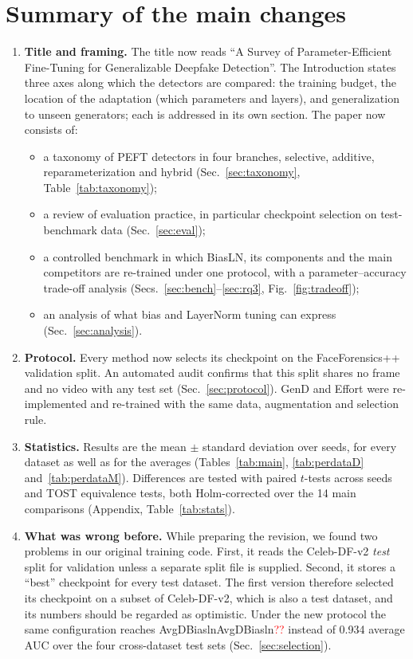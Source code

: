 \documentclass[11pt]{article}
\newcommand{\num}[1]{\ifcsname #1\endcsname\csname #1\endcsname\else\textcolor{red}{??}\fi}
\begin{document}
\section*{Summary of the main changes}
\begin{enumerate}
\item \textbf{Title and framing.} The title now reads ``A Survey of Parameter-Efficient Fine-Tuning for Generalizable Deepfake Detection''. The Introduction states three axes along which the detectors are compared: the training budget, the location of the adaptation (which parameters and layers), and generalization to unseen generators; each is addressed in its own section. The paper now consists of:
  \begin{itemize}
  \item a taxonomy of PEFT detectors in four branches, selective, additive, reparameterization and hybrid (Sec.~\ref{sec:taxonomy}, Table~\ref{tab:taxonomy});
  \item a review of evaluation practice, in particular checkpoint selection on test-benchmark data (Sec.~\ref{sec:eval});
  \item a controlled benchmark in which BiasLN, its components and the main competitors are re-trained under one protocol, with a parameter--accuracy trade-off analysis (Secs.~\ref{sec:bench}--\ref{sec:rq3}, Fig.~\ref{fig:tradeoff});
  \item an analysis of what bias and LayerNorm tuning can express (Sec.~\ref{sec:analysis}).
  \end{itemize}
\item \textbf{Protocol.} Every method now selects its checkpoint on the FaceForensics++ validation split. An automated audit confirms that this split shares no frame and no video with any test set (Sec.~\ref{sec:protocol}). GenD and Effort were re-implemented and re-trained with the same data, augmentation and selection rule.
\item \textbf{Statistics.} Results are the mean $\pm$ standard deviation over seeds, for every dataset as well as for the averages (Tables~\ref{tab:main}, \ref{tab:perdataD} and~\ref{tab:perdataM}). Differences are tested with paired $t$-tests across seeds and TOST equivalence tests, both Holm-corrected over the 14 main comparisons (Appendix, Table~\ref{tab:stats}).
\item \textbf{What was wrong before.} While preparing the revision, we found two problems in our original training code. First, it reads the Celeb-DF-v2 \emph{test} split for validation unless a separate split file is supplied. Second, it stores a ``best'' checkpoint for every test dataset. The first version therefore selected its checkpoint on a subset of Celeb-DF-v2, which is also a test dataset, and its numbers should be regarded as optimistic. Under the new protocol the same configuration reaches \num{AvgDBiasln} instead of 0.934 average AUC over the four cross-dataset test sets (Sec.~\ref{sec:selection}).

\end{enumerate}
\end{document}
